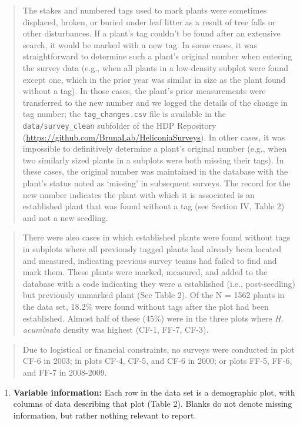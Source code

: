 \documentclass[
  man, donotrepeattitle,floatsintext]{apa6}
\providecommand{\tightlist}{%
  \setlength{\itemsep}{0pt}\setlength{\parskip}{0pt}}
\begin{document}
\begin{quote}
The stakes and numbered tags used to mark plants were sometimes displaced, broken, or buried under leaf litter as a result of tree falls or other disturbances. If a plant's tag couldn't be found after an extensive search, it would be marked with a new tag. In some cases, it was straightforward to determine such a plant's original number when entering the survey data (e.g., when all plants in a low-density subplot were found except one, which in the prior year was similar in size as the plant found without a tag). In those cases, the plant's prior measurements were transferred to the new number and we logged the details of the change in tag number; the \texttt{tag\_changes.csv} file is available in the \texttt{data/survey\_clean} subfolder of the HDP Repository (\url{https://github.com/BrunaLab/HeliconiaSurveys}). In other cases, it was impossible to definitively determine a plant's original number (e.g., when two similarly sized plants in a subplots were both missing their tags). In these cases, the original number was maintained in the database with the plant's status noted as `missing' in subsequent surveys. The record for the new number indicates the plant with which it is associated is an established plant that was found without a tag (see Section IV, Table 2) and not a new seedling.
\end{quote}

\begin{quote}
There were also cases in which established plants were found without tags in subplots where all previously tagged plants had already been located and measured, indicating previous survey teams had failed to find and mark them. These plants were marked, measured, and added to the database with a code indicating they were a established (i.e., post-seedling) but previously unmarked plant (See Table 2). Of the N = 1562 plants in the data set, 18.2\% were found without tags after the plot had been established. Almost half of these (45\%) were in the three plots where \emph{H. acuminata} density was highest (CF-1, FF-7, CF-3).
\end{quote}

\begin{quote}
Due to logistical or financial constraints, no surveys were conducted in plot CF-6 in 2003; in plots CF-4, CF-5, and CF-6 in 2000; or plots FF-5, FF-6, and FF-7 in 2008-2009.
\end{quote}

\begin{enumerate}
\def\labelenumi{\arabic{enumi}.}
\setcounter{enumi}{9}
\tightlist
\item
  \textbf{Variable information:} Each row in the data set is a demographic plot, with columns of data describing that plot (Table 2). Blanks do not denote missing information, but rather nothing relevant to report.
\end{enumerate}
\end{document}
